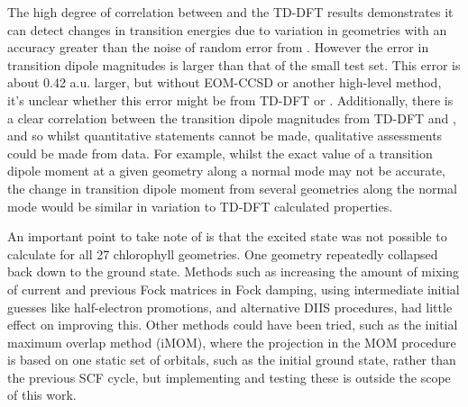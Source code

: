 The high degree of correlation between \dscf and the TD-DFT results demonstrates
it can detect changes in transition energies due to variation in geometries with 
an accuracy greater than the noise of random error from \dscf.
However the error in transition dipole magnitudes is larger than that of the small
test set. This error is about 0.42 a.u. larger, but without EOM-CCSD or another
high-level method, it's unclear whether this error might be from TD-DFT or \dscf.
Additionally, there is a clear correlation between the transition dipole magnitudes
from TD-DFT and \dscf, and so whilst quantitative statements cannot be made, qualitative
assessments could be made from \dscf data. For example, whilst the exact value of
a transition dipole moment at a given geometry along a normal mode may not be accurate,
the change in transition dipole moment from several geometries along the normal 
mode would be similar in variation to TD-DFT calculated properties.

An important point to take note of is that the excited state was not possible to 
calculate for all 27 chlorophyll geometries. One geometry repeatedly collapsed back
down to the ground state. Methods such as increasing the amount of mixing of current
and previous Fock matrices in Fock damping, using intermediate initial guesses like 
half-electron promotions, and alternative DIIS procedures, had little effect on 
improving this. Other methods could have been tried, such as the initial maximum
overlap method (iMOM), where the projection in the MOM procedure is based on one
static set of orbitals, such as the initial ground state, rather than the previous
SCF cycle, but implementing and testing these is outside the scope of this work.

\afterpartskip
